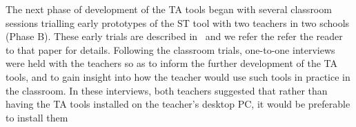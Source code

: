 The next phase of development of the TA tools began with several
classroom sessions trialling early prototypes of the ST tool with two teachers
in two schools (Phase B). %
These early trials are described in~\cite{IEEE-TLT-TA} and 
we refer the refer the reader to that paper for details. 
%
% 
%
Following the classroom trials, one-to-one
interviews were held with the teachers so as to inform the further
development of the TA tools, and to gain insight into how the
teacher would use such tools in practice in the classroom. 
In these interviews, both teachers suggested that rather than
having the TA tools installed on the teacher's desktop PC, 
it would be preferable to install them
